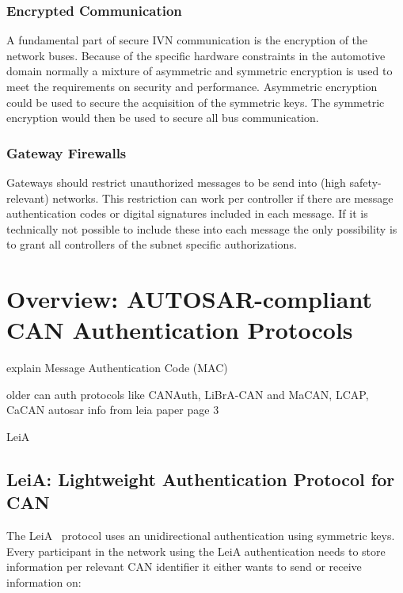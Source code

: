 \subsubsection{Encrypted Communication}

A fundamental part of secure IVN communication is the encryption of the network
buses. Because of the specific hardware constraints in the automotive domain
normally a mixture of asymmetric and symmetric encryption is used to meet the
requirements on security and performance. Asymmetric encryption could be used to
secure the acquisition of the symmetric keys. The symmetric encryption would
then be used to secure all bus communication.

\subsubsection{Gateway Firewalls}

Gateways should restrict unauthorized messages to be send into (high
safety-relevant) networks. This restriction can work per controller if there are
message authentication codes or digital signatures included in each message. If
it is technically not possible to include these into each message the only
possibility is to grant all controllers of the subnet specific authorizations.


\section{Overview: AUTOSAR-compliant CAN Authentication Protocols} 

explain Message Authentication Code (MAC)

older can auth protocols like CANAuth, LiBrA-CAN
and MaCAN, LCAP, CaCAN
autosar info from leia paper page 3

LeiA~\cite{Radu2016}

\subsection{LeiA: Lightweight Authentication Protocol for CAN}
\label{subsec:leia}

The LeiA~\cite{Radu2016} protocol uses an unidirectional authentication using
symmetric keys. Every participant in the network using the LeiA authentication
needs to store information per relevant CAN identifier it either wants to send
or receive information on:

